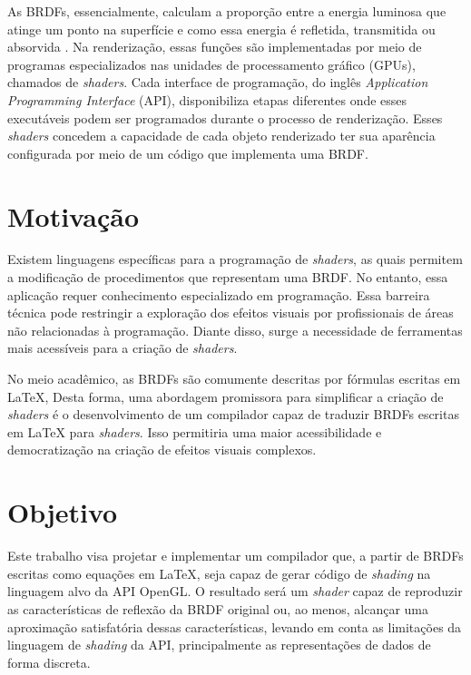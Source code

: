 \documentclass[english,
               brazil,
               bsc] %
               {dcomp-abntex2}
\begin{document}
As BRDFs, essencialmente, calculam a proporção entre a energia luminosa que atinge um ponto na superfície e como essa energia é refletida, transmitida ou absorvida \cite{pbr}. Na renderização, essas funções são implementadas por meio de programas especializados nas unidades de processamento gráfico (GPUs), chamados de \textit{shaders}. Cada interface de programação, do inglês \textit{ Application Programming Interface} (API),  disponibiliza etapas diferentes onde esses executáveis podem ser programados durante o processo de renderização. Esses \textit{shaders} concedem a capacidade de cada objeto renderizado ter sua aparência configurada por meio de um código que implementa uma BRDF.




\section{Motivação}




Existem linguagens específicas para a programação de \textit{shaders}, as quais permitem a modificação de procedimentos que representam uma BRDF. No entanto, essa aplicação requer conhecimento especializado em programação. Essa barreira técnica pode restringir a exploração dos efeitos visuais por profissionais de áreas não relacionadas à programação. Diante disso, surge a necessidade de ferramentas mais acessíveis para a criação de \textit{shaders}.


No meio acadêmico, as BRDFs são comumente descritas por fórmulas escritas em \LaTeX{}, Desta forma, uma abordagem promissora para simplificar a criação de \textit{shaders} é o desenvolvimento de um compilador capaz de traduzir BRDFs   escritas em \LaTeX{} para \textit{shaders}. Isso permitiria uma maior acessibilidade e democratização na criação de efeitos visuais complexos.


\section{Objetivo}
Este trabalho visa projetar e implementar um compilador que, a partir de BRDFs escritas como equações em \LaTeX{}, seja capaz de gerar código de \textit{shading} na linguagem alvo da API OpenGL. O resultado será um \textit{shader} capaz de reproduzir as características de reflexão da BRDF original ou, ao menos, alcançar uma aproximação satisfatória dessas características, levando em conta as limitações da linguagem de \textit{shading} da API, principalmente as representações de dados de forma discreta.
\end{document}
